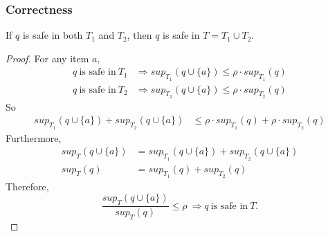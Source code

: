 \subsubsection{Correctness}
\begin{lemma}%
\label{CorrectnessOfPartitioning}
  If $q$ is safe in both $T_1$ and $T_2$, then $q$ is safe in $T = T_1 \cup T_2$.
\end{lemma}
\begin{proof}
For any item $a$,
  \begin{align*}
   q~\text{is safe in}~T_1 &\Rightarrow sup_{T_1}(q\cup\{a\}) \le \rho\cdot sup_{T_1}(q) \\
   q~\text{is safe in}~T_2 &\Rightarrow sup_{T_2}(q\cup\{a\}) \le \rho\cdot sup_{T_2}(q)
  \end{align*}
  So \begin{align*}
   sup_{T_1}(q\cup\{a\}) + sup_{T_2}(q\cup\{a\}) &\le \rho\cdot sup_{T_1}(q) + \rho\cdot sup_{T_2}(q)
  \end{align*}
  Furthermore,
  \begin{align*}
    sup_T(q\cup\{a\}) &= sup_{T_1}(q\cup\{a\}) + sup_{T_2}(q\cup\{a\}) \\
    sup_T(q) &= sup_{T_1}(q) + sup_{T_2}(q)
  \end{align*}
  Therefore, $$ \frac{sup_T(q\cup\{a\})}{sup_T(q)} \le \rho~\Rightarrow q~\text{is safe in}~T.$$ 
\end{proof}

\newtheorem{Theorem}{Theorem}

